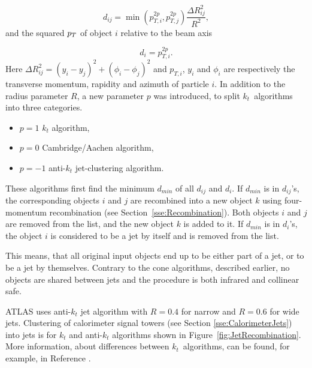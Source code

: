 \begin{equation}
	d_{ij} = \min{\left( p_{T,i}^{2p} , p_{T,j}^{2p} \right)} \frac{\Delta
    R_{ij}^2}{R^2},
\end{equation}
and the squared $p_{T}$ of object $i$ relative to the beam axis

\begin{equation}
	d_i = p_{T,i}^{2p}.
\end{equation}
Here $\Delta R_{ij}^2 = (y_i - y_j)^2 + (\phi_i - \phi_j)^2$ and $p_{T,i}$,
$y_i$ and $\phi_i$ are respectively the transverse momentum, rapidity and
azimuth of particle $i$. In addition to the radius parameter $R$, a new
parameter $p$ was introduced, to split $k_t$~algorithms into three categories.  
\begin{itemize}
	\item $p = 1$ $k_t$ algorithm,
	\item $p = 0$ Cambridge/Aachen algorithm,
	\item $p = -1$ anti-$k_t$ jet-clustering algorithm.
\end{itemize}

These algorithms first find the minimum $d_{min}$ of all $d_{ij}$ and $d_i$. If
$d_{min}$ is in $d_{ij}$'s, the corresponding objects $i$ and $j$ are recombined
into a new object $k$ using four-momentum recombination (see
Section~\ref{sse:Recombination}). Both objects $i$ and
$j$ are removed from the list, and the new object $k$ is added to it. If
$d_{min}$ is in $d_i$'s, the object $i$ is considered to be a jet by itself and
is removed from the list.

This means, that all original input objects end up to be either part of a jet, or
to be a jet by themselves. Contrary to the cone algorithms, described earlier, no
objects are shared between jets and the procedure is both infrared and collinear
safe.

ATLAS uses anti-$k_t$ jet algorithm with $R=0.4$ for narrow and $R=0.6$ for wide
jets.  Clustering of calorimeter signal towers (see Section
\ref{sse:CalorimeterJets}) into jets is for $k_t$ and anti-$k_t$ algorithms shown
in Figure~\ref{fig:JetRecombination}.  More information, about differences
between $k_t$~algorithms, can be found, for example, in Reference \cite{ANTIKT}.

